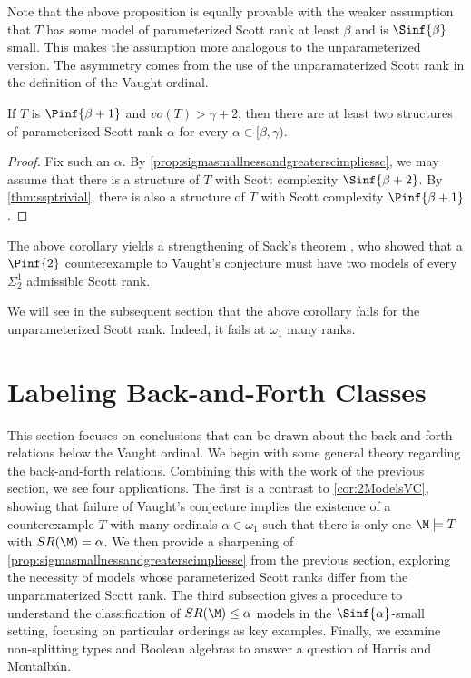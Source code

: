 \documentclass{amsart}
\renewcommand{\-}{\text{-}}
\begin{document}
Note that the above proposition is equally provable with the weaker assumption that $T$ has some model of parameterized Scott rank at least $\beta$ and is $\Sinf{\beta}$ small.
This makes the assumption more analogous to the unparameterized version.
The asymmetry comes from the use of the unparamaterized Scott rank in the definition of the Vaught ordinal. 

\begin{corollary}
If $T$ is $\Pinf{\beta+1}$ and $vo(T)>\gamma+2$, then there are at least two structures of parameterized Scott rank $\alpha$ for every $\alpha\in[\beta,\gamma)$.
\end{corollary}

\begin{proof}
Fix such an $\alpha$. By \cref{prop:sigmasmallnessandgreaterscimpliessc}, we may assume that there is a structure of $T$ with Scott complexity $\Sinf{\beta+2}$. By \cref{thm:ssptrivial}, there is also a structure of $T$ with Scott complexity $\Pinf{\beta+1}$.
\end{proof}

The above corollary yields a strengthening of Sack's theorem \cite{Sac83}, who showed that a $\Pinf{2}$ counterexample to Vaught's conjecture must have two models of every $\Sigma_2^1$ admissible Scott rank.

\twomodelsvc

We will see in the subsequent section that the above corollary fails for the unparameterized Scott rank.
Indeed, it fails at $\omega_1$ many ranks.



\section{Labeling Back-and-Forth Classes}
This section focuses on conclusions that can be drawn about the back-and-forth relations below the Vaught ordinal.
We begin with some general theory regarding the back-and-forth relations.
Combining this with the work of the previous section, we see four applications.
The first is a contrast to \cref{cor:2ModelsVC}, showing that failure of Vaught's conjecture implies the existence of a counterexample $T$ with many ordinals $\alpha\in\omega_1$ such that there is only one $\M\models T$ with $SR(\M)=\alpha$.
We then provide a sharpening of \cref{prop:sigmasmallnessandgreaterscimpliessc} from the previous section, exploring the necessity of models whose parameterized Scott ranks differ from the unparamaterized Scott rank.
The third subsection gives a procedure to understand the classification of $SR(\M)\leq\alpha$ models in the $\Sinf{\alpha}$-small setting, focusing on particular orderings as key examples.
Finally, we examine non-splitting types and Boolean algebras to answer a question of Harris and Montalb\'an.
\end{document}
